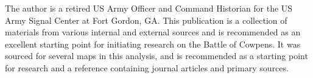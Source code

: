 The author is a retired US Army Officer and Command Historian for the US Army
Signal Center at Fort Gordon, GA.  This publication is a collection of
materials from various internal and external sources and is recommended as an
excellent starting point for initiating research on the Battle of Cowpens. It
was sourced for several maps in this analysis, and is recommended as a starting
point for research and a reference containing journal articles and  primary sources.
